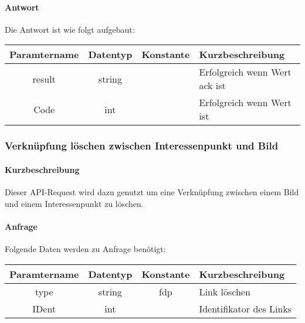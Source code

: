 \paragraph{Antwort}Die Antwort ist wie folgt aufgebaut:
\begin{table}[H]
	\begin{tabular}{|c|c|c|p{6.5cm}|}
		\hline
		\textbf{Paramtername} & \textbf{Datentyp} & \textbf{Konstante} & \textbf{Kurzbeschreibung}                                                                                               \\ \hline
		result              & string           &                 & Erfolgreich wenn Wert {\glqq ack\grqq} ist \\ \hline
		Code                & int              &                 & Erfolgreich wenn Wert {\glqq 0\grqq} ist \\ \hline
	\end{tabular}
\end{table}
\subsubsection{Verknüpfung löschen zwischen Interessenpunkt und Bild}
\paragraph{Kurzbeschreibung}Dieser API-Request wird dazu genutzt um eine Verknüpfung zwischen einem Bild und einem Interessenpunkt zu löschen.
\paragraph{Anfrage}Folgende Daten werden zu Anfrage benötigt:
\begin{table}[H]
	\begin{tabular}{|c|c|c|p{6.5cm}|}
		\hline
		\textbf{Paramtername} & \textbf{Datentyp} & \textbf{Konstante} & \textbf{Kurzbeschreibung}                                                                                               \\ \hline
		type                & string            & fdp                & Link löschen \\ \hline
		IDent               & int               &                    & Identifikator des Links \\ \hline
	\end{tabular}
\end{table}
